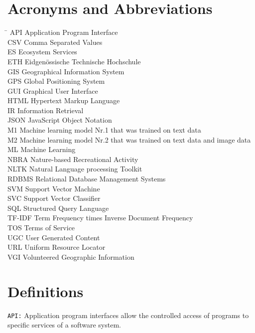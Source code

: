 \section*{Acronyms and Abbreviations}
\begin{tabbing}
 \hspace*{1.6cm}  \= \kill
 API \> Application Program Interface \\
 CSV \> Comma Separated Values \\
 ES \> Ecosystem Services \\
 ETH \> Eidgen\"{o}ssische Technische Hochschule \\
 GIS \> Geographical Information System \\
 GPS \> Global Positioning System \\
 GUI \> Graphical User Interface \\
 HTML \> Hypertext Markup Language \\
 IR \> Information Retrieval \\
 JSON \> JavaScript Object Notation \\
 M1 \> Machine learning model Nr.1 that was trained on text data \\
 M2 \> Machine learning model Nr.2 that was trained on text data and image data \\
 ML \> Machine Learning \\
 NBRA \> Nature-based Recreational Activity \\
 NLTK \> Natural Language processing Toolkit \\ 
 RDBMS \> Relational Database Management Systems \\
 SVM \> Support Vector Machine \\
 SVC \> Support Vector Classifier \\
 SQL \> Structured Query Language \\
 TF-IDF \> Term Frequency times Inverse Document Frequency \\
 TOS \> Terms of Service \\
 UGC \> User Generated Content \\
 URL \> Uniform Resource Locator \\ 
 VGI \> Volunteered Geographic Information
\end{tabbing}

\section*{Definitions} \label{definitions}
\texttt{API:} Application program interfaces allow the controlled access of programs to specific services of a software system. 
\newline

